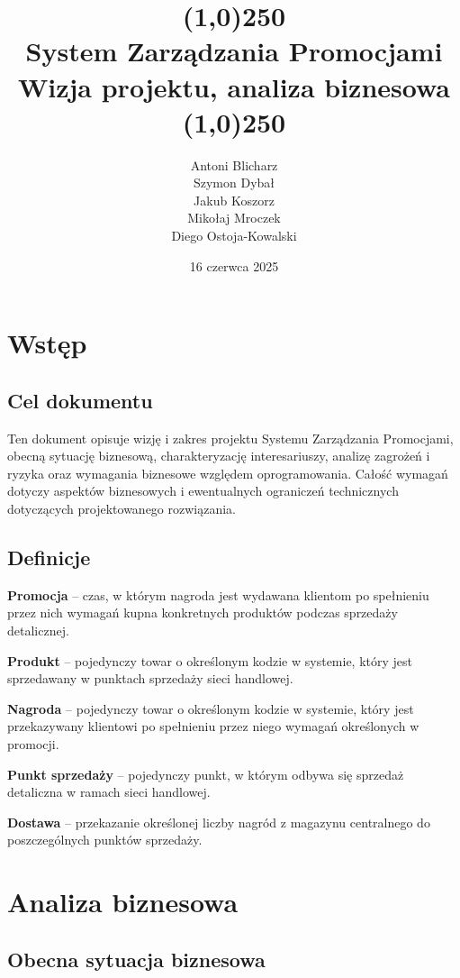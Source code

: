 \documentclass[a4paper,12pt]{article}
\title{
    \line(1,0){250}\\
    System Zarządzania Promocjami\\
    Wizja projektu, analiza biznesowa\\
    \line(1,0){250}}
\author{Antoni Blicharz\\
        Szymon Dybał\\
        Jakub Koszorz\\
        Mikołaj Mroczek\\
        Diego Ostoja-Kowalski\\}
\date{16 czerwca 2025}
\begin{document}
\begin{titlepage}
    \maketitle
\end{titlepage}

\newpage

\section{Wstęp}

\subsection{Cel dokumentu}

Ten dokument opisuje wizję i zakres projektu Systemu Zarządzania Promocjami, obecną sytuację biznesową, charakteryzację interesariuszy, analizę zagrożeń i ryzyka oraz wymagania biznesowe względem oprogramowania.
Całość wymagań dotyczy aspektów biznesowych i ewentualnych ograniczeń technicznych dotyczących projektowanego rozwiązania.

\subsection{Definicje}

\textbf{Promocja} -- czas, w którym nagroda jest wydawana klientom po spełnieniu przez nich wymagań kupna konkretnych produktów podczas sprzedaży detalicznej.

\textbf{Produkt} -- pojedynczy towar o określonym kodzie w systemie, który jest sprzedawany w punktach sprzedaży sieci handlowej.

\textbf{Nagroda} -- pojedynczy towar o określonym kodzie w systemie, który jest przekazywany klientowi po spełnieniu przez niego wymagań określonych w promocji.

\textbf{Punkt sprzedaży} -- pojedynczy punkt, w którym odbywa się sprzedaż detaliczna w ramach sieci handlowej.

\textbf{Dostawa} -- przekazanie określonej liczby nagród z magazynu centralnego do poszczególnych punktów sprzedaży.

\section{Analiza biznesowa}

\subsection{Obecna sytuacja biznesowa}
\end{document}
